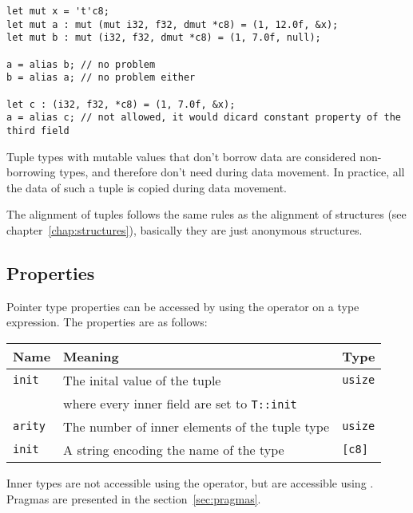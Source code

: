 \begin{lstlisting}[style=coloredverbatim]
let mut x = 't'c8;
let mut a : mut (mut i32, f32, dmut *c8) = (1, 12.0f, &x);
let mut b : mut (i32, f32, dmut *c8) = (1, 7.0f, null);

a = alias b; // no problem
b = alias a; // no problem either

let c : (i32, f32, *c8) = (1, 7.0f, &x);
a = alias c; // not allowed, it would dicard constant property of the third field
\end{lstlisting}

Tuple types with mutable values that don't borrow data are considered
non-borrowing types, and therefore don't need  during data
movement. In practice, all the data of such a tuple is copied during data
movement.

The alignment of tuples follows the same rules as the alignment of structures
(see chapter~\ref{chap:structures}), basically they are just anonymous
structures.

\subsection {Properties}

Pointer type properties can be accessed by using the \token{::} operator on a
type expression. The properties are as follows:
\smallskip

\begin{center}
  \begin{adjustbox}{max width=\linewidth}
    \begin{tabular}{|l|ll|}
      \hline
      Name & Meaning & Type\\
      \hline
      \hline
      \texttt{init} & The inital value of the tuple & \texttt{usize} \\
      & where every inner field are set to \texttt{T::init} & \\
      \Xhline{0.001pt}
      \texttt{arity} & The number of inner elements of the tuple type & \texttt{usize}\\
      \hline
      \texttt{init} & A string encoding the name of the type & \texttt{[c8]} \\
      \hline
    \end{tabular}
  \end{adjustbox}
\end{center}

\smallskip

Inner types are not accessible using the \token{::} operator, but are
accessible using . Pragmas are presented in the
section~\ref{sec:pragmas}.

